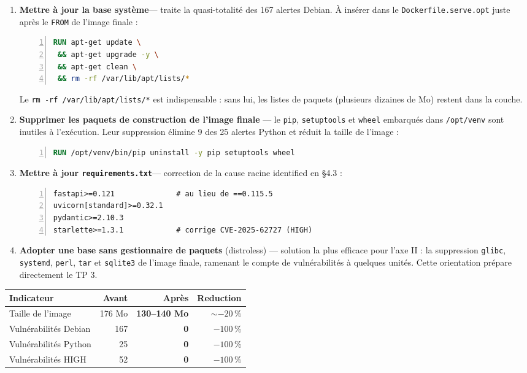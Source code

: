 \documentclass[11pt,a4paper]{report}
\newcommand{\num}[1]{\textbf{#1}}
\begin{document}
\begin{enumerate}
  \item \textbf{Mettre à jour la base système}--- traite la quasi-totalité des
        167 alertes Debian. À insérer dans le \texttt{Dockerfile.serve.opt}
        juste après le \texttt{FROM} de l'image finale :
\begin{lstlisting}[language=Dockerfile,numbers=left,numbers=none]
RUN apt-get update \
 && apt-get upgrade -y \
 && apt-get clean \
 && rm -rf /var/lib/apt/lists/*
\end{lstlisting}
        Le \texttt{rm -rf /var/lib/apt/lists/*} est indispensable : sans
        lui, les listes de paquets (plusieurs dizaines de Mo) restent dans la
        couche.

  \item \textbf{Supprimer les paquets de construction de l'image finale}
--- le \texttt{pip}, \texttt{setuptools} et \texttt{wheel} embarqués dans
        \texttt{/opt/venv} sont inutiles à l'exécution. Leur suppression
        élimine 9 des 25 alertes Python et réduit la taille de l'image :
\begin{lstlisting}[language=Dockerfile,numbers=left,numbers=none]
RUN /opt/venv/bin/pip uninstall -y pip setuptools wheel
\end{lstlisting}

  \item \textbf{Mettre à jour \texttt{requirements.txt}}--- correction de la
        cause racine identified en §4.3 :
\begin{lstlisting}[numbers=left,numbers=none]
fastapi>=0.121              # au lieu de ==0.115.5
uvicorn[standard]>=0.32.1
pydantic>=2.10.3
starlette>=1.3.1            # corrige CVE-2025-62727 (HIGH)
\end{lstlisting}

  \item \textbf{Adopter une base sans gestionnaire de paquets} (distroless)
--- solution la plus efficace pour l'axe II : la suppression
        \texttt{glibc}, \texttt{systemd}, \texttt{perl}, \texttt{tar} et
        \texttt{sqlite3} de l'image finale, ramenant le compte de
        vulnérabilités à quelques unités. Cette orientation prépare
        directement le TP 3.
\end{enumerate}

\begin{resultat}[Effet attendu de la remédiation]
\begin{center}
\begin{tabular}{@{}lrrr@{}}
\toprule
\textbf{Indicateur} & \textbf{Avant} & \textbf{Après} & \textbf{Reduction} \\
\midrule
Taille de l'image       & 176 Mo & \num{130--140 Mo} & $\sim-20\,\%$ \\
Vulnérabilités Debian   & 167    & \textbf{0}       & $-100\,\%$ \\
Vulnérabilités Python   & 25     & \textbf{0}       & $-100\,\%$ \\
Vulnérabilités HIGH     & 52     & \textbf{0}       & $-100\,\%$ \\
\bottomrule
\end{tabular}
\end{center}
\end{resultat}
\end{document}

